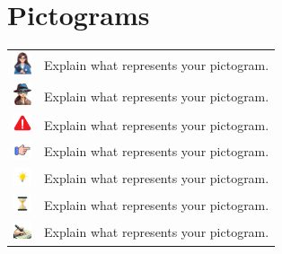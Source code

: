 \section*{Pictograms}
\begin{longtable}{>{\raggedright}p{6cm}p{12cm}}
    \includegraphics[width=15pt]{figs/eve.pdf} & Explain what represents your pictogram.\\
    \includegraphics[width=15pt]{figs/alice.pdf} & Explain what represents your pictogram. \\
    \includegraphics[width=15pt]{figs/warning.pdf} & Explain what represents your pictogram.\\
    \includegraphics[width=15pt]{figs/hypothesis.pdf} & Explain what represents your pictogram.\\
    \includegraphics[width=15pt]{figs/idea.pdf} & Explain what represents your pictogram. \\
    \includegraphics[width=15pt]{figs/sablier.pdf} & Explain what represents your pictogram.\\
    \includegraphics[width=15pt]{figs/writing.pdf} & Explain what represents your pictogram.\\
\end{longtable}



